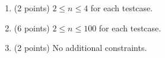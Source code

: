 \begin{enumerate}
    \tightlist
    \item (2 points) $2 \leq n \leq 4$ for each testcase.
    \item (6 points) $2 \leq n \leq 100$ for each testcase.
    \item (2 points) No additional constraints.
\end{enumerate}
    